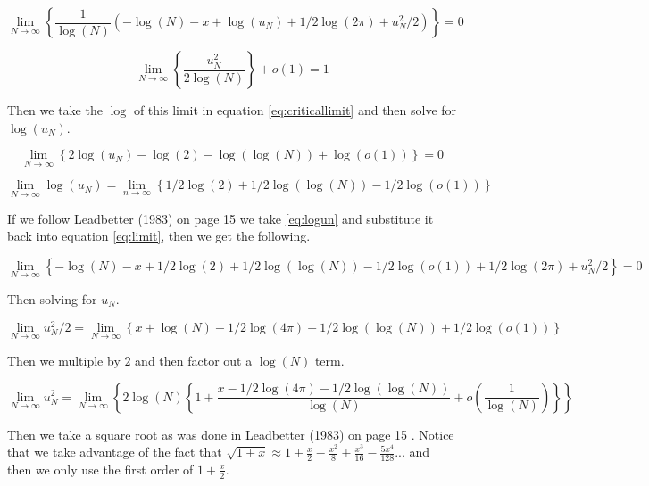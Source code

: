 \documentclass[paper=a4, fontsize=11pt]{article} %
\begin{document}
\begin{equation}
\label{eq:multlimit}
\lim_{N\rightarrow\infty}\left\{\frac{1}{\log(N)}\left(-\log(N) - x + \log(u_N) + 1/2\log(2\pi) + u_N^2/2\right)\right\} = 0
\end{equation}

\begin{equation}
\label{eq:criticallimit}
\lim_{N\rightarrow\infty}\left\{\frac{u_N^2}{2\log(N)}\right\} + o(1) = 1
\end{equation}

Then we take the \(\log\) of this limit in equation \ref{eq:criticallimit} and then solve for \(\log(u_N)\).

\begin{equation}
\lim_{N\rightarrow\infty}\left\{2\log(u_N) - \log(2) - \log(\log(N)) + \log(o(1))\right\} = 0
\end{equation}

\begin{equation}
\label{eq:logun}
\lim_{N\rightarrow\infty}\log(u_N) = \lim_{n\rightarrow\infty}\left\{1/2\log(2) + 1/2\log(\log(N)) - 1/2\log(o(1))\right\}
\end{equation}

If we follow Leadbetter (1983) on page 15 \cite{leadbetter} we take \ref{eq:logun} and substitute it back into equation \ref{eq:limit}, then we get the following.

\begin{equation}
\lim_{N\rightarrow\infty}\left\{-\log(N) - x + 1/2\log(2) + 1/2\log(\log(N)) - 1/2\log(o(1)) + 1/2\log(2\pi) + u_N^2/2\right\} = 0
\end{equation}

Then solving for \(u_N\).

\begin{equation}
\lim_{N\rightarrow\infty}u_N^2/2 = \lim_{N\rightarrow\infty}\left\{x + \log(N) - 1/2\log(4\pi) - 1/2\log(\log(N)) + 1/2\log(o(1))\right\}
\end{equation}

Then we multiple by \(2\) and then factor out a \(\log(N)\) term.

\begin{equation}
\lim_{N\rightarrow\infty}u_N^2 = \lim_{N\rightarrow\infty}\left\{2\log(N)\left\{1 + \frac{x-1/2\log(4\pi)-1/2\log(\log(N))}{\log(N)} + o\left(\frac{1}{\log(N)}\right)\right\}\right\}
\end{equation}

Then we take a square root as was done in Leadbetter (1983) on page 15 \cite{leadbetter}. Notice that we take advantage of the fact that \(\sqrt{1+x} \approx 1 + \frac{x}{2} - \frac{x^2}{8} + \frac{x^3}{16} - \frac{5x^4}{128} ...\) and then we only use the first order of \(1+\frac{x}{2}\).
\end{document}
